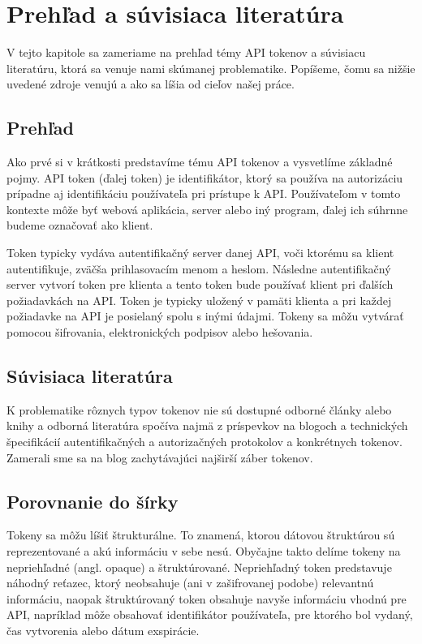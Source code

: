 \chapter{Prehľad a súvisiaca literatúra}

\label{kap:du} %

V tejto kapitole sa zameriame na prehľad témy API tokenov a súvisiacu literatúru, ktorá sa venuje nami skúmanej problematike. Popíšeme, čomu sa nižšie uvedené zdroje venujú a ako sa líšia od cieľov našej práce.

\section{Prehľad}
Ako prvé si v krátkosti predstavíme tému API tokenov a vysvetlíme základné pojmy. API token (ďalej token) je identifikátor, ktorý sa používa na autorizáciu prípadne aj identifikáciu používateľa pri prístupe k API. Používateľom v tomto kontexte môže byť webová aplikácia, server alebo iný program, ďalej ich súhrnne budeme označovať ako klient. 

Token typicky vydáva autentifikačný server danej API, voči ktorému sa klient autentifikuje, zväčša prihlasovacím menom a heslom. Následne autentifikačný server vytvorí token pre klienta a tento token bude používať klient pri ďalších požiadavkách na API. Token je typicky uložený v pamäti klienta a pri každej požiadavke na API je posielaný spolu s inými údajmi. Tokeny sa môžu vytvárať pomocou šifrovania, elektronických podpisov alebo hešovania.


\section{Súvisiaca literatúra}
K problematike rôznych typov tokenov nie sú dostupné odborné články alebo knihy a odborná literatúra spočíva najmä z príspevkov na blogoch a technických špecifikácií autentifikačných a autorizačných protokolov a konkrétnych tokenov. Zamerali sme sa na blog zachytávajúci najširší záber tokenov.

\section{Porovnanie do šírky}
Tokeny sa môžu líšiť štrukturálne. To znamená, ktorou dátovou štruktúrou sú reprezentované a akú informáciu v sebe nesú. Obyčajne takto delíme tokeny na nepriehľadné (angl. opaque) a štruktúrované. Nepriehľadný token predstavuje náhodný reťazec, ktorý neobsahuje (ani v zašifrovanej podobe) relevantnú informáciu, naopak štruktúrovaný token obsahuje navyše informáciu vhodnú pre API, napríklad môže obsahovať identifikátor používateľa, pre ktorého bol vydaný, čas vytvorenia alebo dátum exspirácie.

